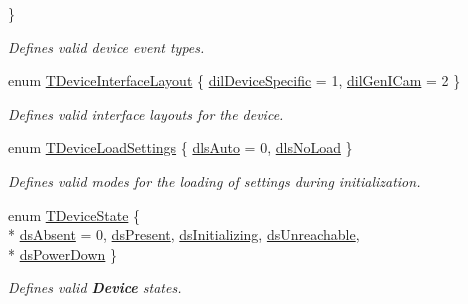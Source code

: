 \begin{DoxyCompactItemize}
 \}
\begin{DoxyCompactList}\small\item\em Defines valid device event types. \end{DoxyCompactList}\item 
enum \hyperlink{group___common_interface_ga8206c9f9a594b7c21b43aaa624a86220}{T\+Device\+Interface\+Layout} \{ \hyperlink{group___common_interface_gga8206c9f9a594b7c21b43aaa624a86220a1c2d04e0af3f97abd39f3e0dbc0a567d}{dil\+Device\+Specific} = 1, 
\hyperlink{group___common_interface_gga8206c9f9a594b7c21b43aaa624a86220ad2eaec878b614e46b3dd5e8cd725f58b}{dil\+Gen\+I\+Cam} = 2
 \}
\begin{DoxyCompactList}\small\item\em Defines valid interface layouts for the device. \end{DoxyCompactList}\item 
enum \hyperlink{group___common_interface_gae5dacc6187e94639fe9153711917d6e3}{T\+Device\+Load\+Settings} \{ \hyperlink{group___common_interface_ggae5dacc6187e94639fe9153711917d6e3a2f1ebbfd3f6fffa2e1845536517dc41b}{dls\+Auto} = 0, 
\hyperlink{group___common_interface_ggae5dacc6187e94639fe9153711917d6e3af68205716389544a087d51a8492f5d92}{dls\+No\+Load}
 \}
\begin{DoxyCompactList}\small\item\em Defines valid modes for the loading of settings during initialization. \end{DoxyCompactList}\item 
enum \hyperlink{group___common_interface_ga1207fea3233acb11831696cd74e142e8}{T\+Device\+State} \{ \\*
\hyperlink{group___common_interface_gga1207fea3233acb11831696cd74e142e8af26f60ad35f31f49730bcc91121e45da}{ds\+Absent} = 0, 
\hyperlink{group___common_interface_gga1207fea3233acb11831696cd74e142e8aaea3b2eac280b43a21752bce7199fca6}{ds\+Present}, 
\hyperlink{group___common_interface_gga1207fea3233acb11831696cd74e142e8ac209e7998032d2474be5c69fae9472fc}{ds\+Initializing}, 
\hyperlink{group___common_interface_gga1207fea3233acb11831696cd74e142e8acc0ce819ce175b0a9be645d5402bbc33}{ds\+Unreachable}, 
\\*
\hyperlink{group___common_interface_gga1207fea3233acb11831696cd74e142e8abed97091db756a48b70cde7dd2bd5f54}{ds\+Power\+Down}
 \}
\begin{DoxyCompactList}\small\item\em Defines valid {\bfseries Device} states. \end{DoxyCompactList}\item 

\end{DoxyCompactItemize}
